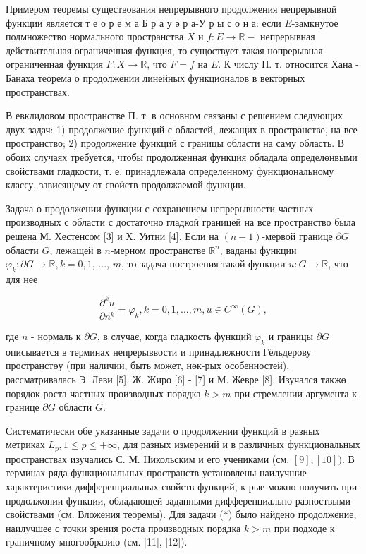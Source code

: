 \documentclass[10pt]{article}
\begin{document}
Примером теоремы существования непрерывного продолжения непрерывной функции является т е о р е м а Б р а у ә р а-У р ы с о н а: если $E$-замкнутое подмножество нормального пространства $X$ и $f: E \rightarrow \mathbb{R}-$ непрерывная действительная ограниченная функция, то сущөствует такая нөпрерывная ограниченная функция $F: X \rightarrow \mathbb{R}$, что $F=f$ на $E$. К числу П. т. относится Хана - Банаха теорема о продолжении линейных функционалов в векторных пространствах.



В евклидовом пространстве П. т. в основном связаны с решением следующих двух задач: 1) продолжение функций с областей, лежащих в пространстве, на все пространство; 2) продолжение функций с границы области на саму область. В обоих случаях требуется, чтобы продолженная функция обладала определөнвыми свойствами гладкости, т. е. принадлежала определенному функциональному классу, зависящему от своӥств продолжаемой функции.



Задача о продолжении функции с сохранением непрерывности частных производных с области с достаточно гладкой границей на все пространство была решена М. Хестенсом [3] и Х. Уитни [4]. Если на $(n-1)$-мервой границе $\partial G$ области $G$, лежащей в $n$-мерном пространстве $\mathbb{R}^{n}$, ваданы функции $\varphi_{k}: \partial G \rightarrow \mathbb{R}, k=0,1$, ..., $m$, то задача построения такой функции $u: G \rightarrow \mathbb{R}$, что для нее



\[

\frac{\partial^{k} u}{\partial n^{k}}=\varphi_{k}, k=0,1, \ldots, m, u \in C^{\infty}(G),

\]



где $n$ - нормаль к $\partial G$, в случає, когда гладкость функций $\varphi_{k}$ и границы $\partial G$ описывается в терминах непрерыввости и принадлежности Гёльдерову пространстөу (при наличии, быть может, нөк-рых особенностей), рассматривалась Э. Леви [5], Ж. Жиро [6] - [7] и М. Жевре [8]. Изучался такжө порядок роста частных производных порядка $k>m$ при стремлении аргумента к границе $\partial G$ области $G$.



Систематически обе указанные задачи о продолжении функций в разных метриках $L_{p}, 1 \leqslant p \leqslant+\infty$, для разных измерений и в различных функциональных пространствах изучались С. М. Никольским и его учениками (см. $[9],[10])$. В терминах ряда функциональных пространств установлены наилучшие характеристики дифференциальных свойств функций, к-рые можно получить при продолжөнии функции, обладающей заданными дифференциально-разноствыми свойствами (см. Вложения теоремы). Для задачи (*) было найдено продолжение, наилучшее с точки зрения роста производных порядка $k>m$ при подходе к граничному многообразию (см. [11], [12]).
\end{document}
